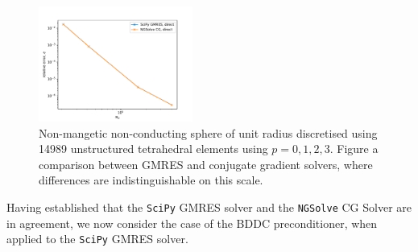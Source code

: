 \documentclass[a4paper,12]{elsarticle}
\theoremstyle{definition}
\begin{document}
\begin{figure}
\centering
\includegraphics[width=0.45\textwidth]{Sphere_convergence_scipy_ngsolve_comp.pdf}
\caption{Non-mangetic non-conducting sphere of unit radius discretised using 14989 unstructured tetrahedral elements using $p=0,1,2,3$. Figure a comparison between GMRES and conjugate gradient solvers, where differences are indistinguishable on this scale.}
\label{fig:sphere_solver_comparison}
\end{figure}

Having established that the \texttt{SciPy} GMRES solver and the \texttt{NGSolve} CG Solver are in agreement, we now consider the case of the BDDC preconditioner, when applied to the \texttt{SciPy} GMRES solver.



\end{document}
